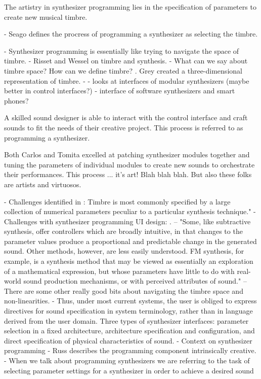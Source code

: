 The artistry in synthesizer programming lies in the specification of parameters to create new musical timbre.

- Seago defines the procress of programming a synthesizer as selecting the timbre. \cite{seago2004critical}

- Synthesizer programming is essentially like trying to navigate the space of timbre.
- Risset and Wessel \cite{risset1999exploration} on timbre and synthesis.
- What can we say about timbre space? How can we define timbre? \cite{grey1977multidimensional}. Grey created a three-dimensional representation of timbre.
- \cite{bates2021interface} - looks at interfaces of modular synthesizers (maybe better in control interfaces?) 
- \cite{d2016interface} interface of software synthesizers and smart phones?

A skilled sound designer is able to interact with the control interface and craft sounds to fit the needs of their creative project. This process is referred to as programming a synthesizer. 

Both Carlos and Tomita excelled at patching synthesizer modules together and tuning the parameters of individual modules to create new sounds to orchestrate their performances. This process ... it's art! Blah blah blah. But also these folks are artists and virtuosos.

- Challenges identified in \cite{ethington1994seawave}: Timbre is most commonly specified by a large collection of numerical parameters peculiar to a particular synthesis technique."
- Challenges with synthesizer programming UI design: \cite{seago2013new}. -- "Some, like subtractive synthesis, offer controllers which are broadly intuitive, in that changes to the parameter values produce a proportional and predictable change in the generated sound. Other methods, however, are less easily understood. FM synthesis, for example, is a synthesis method that may be viewed as essentially an exploration of a mathematical expression, but whose parameters have little to do with real-world sound production mechanisms, or with perceived attributes of sound." -- There are some other really good bits about navigating the timbre space and non-linearities.
- \cite{seago2004critical} Thus, under most current systems, the user is obliged to express directives for sound specification in system terminology, rather than in language derived from the user domain. Three types of synthesizer interfaces: parameter selection in a fixed architecture, architecture specification and configuration, and direct specification of physical characteristics of sound.
- Context on synthesizer programming \cite{jenkins2019analog}
- Russ describes the programming component intrinsically creative.
- When we talk about programming synthesizers we are referring to the task of selecting parameter settings for a synthesizer in order to achieve a desired sound

